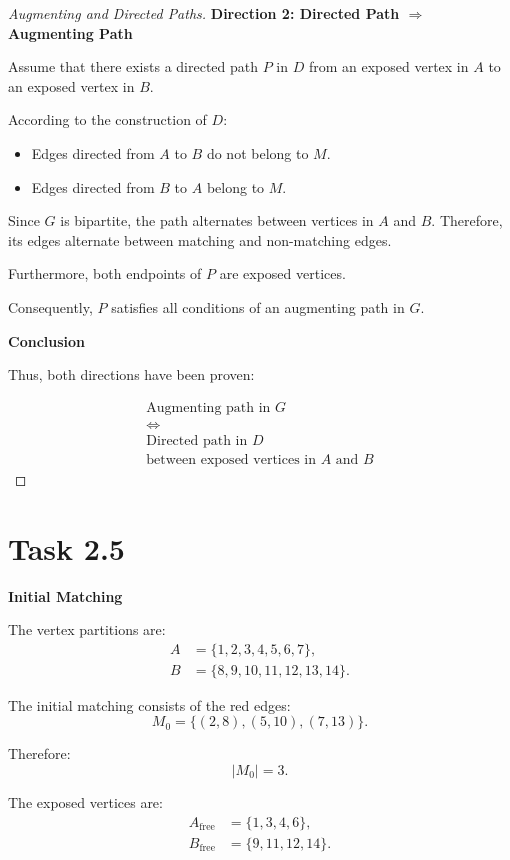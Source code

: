 \documentclass{Group_Templ}
\begin{document}
\begin{proof}[Augmenting and Directed Paths]
	\medskip
	\noindent\textbf{Direction 2:
		Directed Path $\Rightarrow$ Augmenting Path}
	
	Assume that there exists a directed path $P$ in $D$
	from an exposed vertex in $A$ to an exposed
	vertex in $B$.
	
	According to the construction of $D$:
	
	\begin{itemize}
		\item Edges directed from $A$ to $B$ do not
		belong to $M$.
		\item Edges directed from $B$ to $A$ belong
		to $M$.
	\end{itemize}
	
	Since $G$ is bipartite, the path alternates between
	vertices in $A$ and $B$. Therefore, its edges
	alternate between matching and non-matching edges.
	
	Furthermore, both endpoints of $P$ are
	exposed vertices.
	
	Consequently, $P$ satisfies all conditions of
	an augmenting path in $G$.
	
	\medskip
	\noindent\textbf{Conclusion}
	
	Thus, both directions have been proven:
	
	\[
	\boxed{
		\begin{gathered}
			\text{Augmenting path in } G\\
			\iff\\
			\text{Directed path in } D\\
			\text{between exposed vertices in }
			A \text{ and } B
		\end{gathered}
	}
	\]
\end{proof}
\newpage


\section*{Task 2.5}

\noindent\textbf{Initial Matching}

The vertex partitions are:
\[
\begin{aligned}
	A &= \{1,2,3,4,5,6,7\},\\
	B &= \{8,9,10,11,12,13,14\}.
\end{aligned}
\]

The initial matching consists of the red edges:
\[
M_0 = \{(2,8),(5,10),(7,13)\}.
\]

Therefore:
\[
|M_0| = 3.
\]

The exposed vertices are:
\[
\begin{aligned}
	A_{\mathrm{free}} &= \{1,3,4,6\},\\
	B_{\mathrm{free}} &= \{9,11,12,14\}.
\end{aligned}
\]
\end{document}
